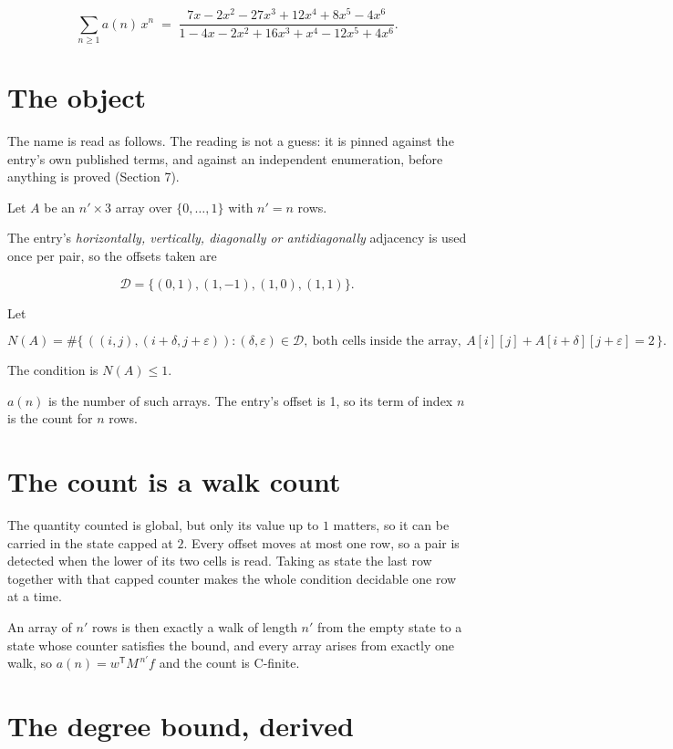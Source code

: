\documentclass[11pt]{article}
\theoremstyle{definition}
\begin{document}
\[\sum_{n \ge 1} a(n)\,x^n \;=\; \frac{7x - 2x^{2} - 27x^{3} + 12x^{4} + 8x^{5} - 4x^{6}}{1 - 4x - 2x^{2} + 16x^{3} + x^{4} - 12x^{5} + 4x^{6}}.\]

\section{The object}

The name is read as follows. The reading is not a guess: it is pinned against the entry's own published terms, and against an independent enumeration, before anything is proved (Section 7).

Let $A$ be an $n' \times 3$ array over $\{0,\dots,1\}$ with $n' = n$ rows.

The entry's {\itshape horizontally, vertically, diagonally or antidiagonally} adjacency is used once per pair, so the offsets taken are

\[\mathcal{D} = \{(0,1), (1,-1), (1,0), (1,1)\}.\]

Let

\[N(A) = \#\bigl\{\,((i,j),(i{+}\delta,j{+}\varepsilon)) : (\delta,\varepsilon) \in \mathcal{D},\ \text{both cells inside the array},\ A[i][j] + A[i{+}\delta][j{+}\varepsilon] = 2\,\bigr\}.\]

The condition is $N(A) \le 1$.

$a(n)$ is the number of such arrays. The entry's offset is 1, so its term of index $n$ is the count for $n$ rows.

\section{The count is a walk count}

The quantity counted is global, but only its value up to $1$ matters, so it can be carried in the state capped at $2$. Every offset moves at most one row, so a pair is detected when the lower of its two cells is read. Taking as state the last row together with that capped counter makes the whole condition decidable one row at a time.

An array of $n'$ rows is then exactly a walk of length $n'$ from the empty state to a state whose counter satisfies the bound, and every array arises from exactly one walk, so $a(n) = w^{\mathsf T}M^{\,n'}f$ and the count is C-finite.

\section{The degree bound, derived}
\end{document}
